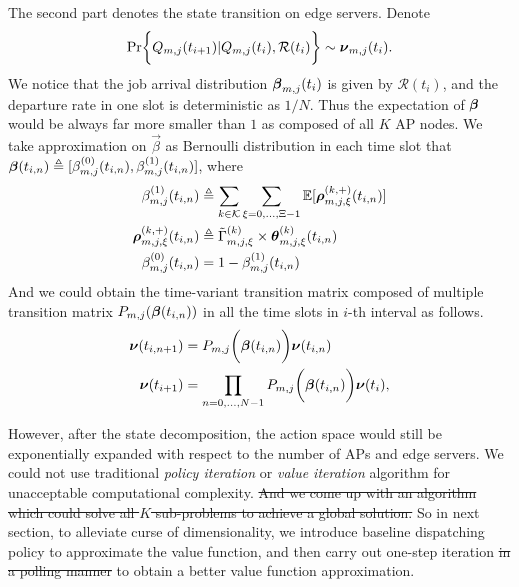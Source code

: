 The second part denotes the state transition on edge servers.
Denote
\begin{align}
    \Pr\Brace{ Q_{m,j}(t_{i+1})|Q_{m,j}(t_{i}), \mathcal{R}(t_{i}) } \sim \vecG{\nu}_{m,j}(t_{i}).
\end{align}
We notice that the job arrival distribution $\boldsymbol{\beta}_{m,j}(t_{i})$ is given by $\mathcal{R}(t_{i})$, and the departure rate in one slot is deterministic as $1/N$.
Thus the expectation of $\boldsymbol{\beta}$ would be always far more smaller than $1$ as composed of all $K$ AP nodes.
We take approximation on $\vec{\beta}$ as Bernoulli distribution in each time slot that $\boldsymbol{\beta}(t_{i,n}) \triangleq [\beta^{(0)}_{m,j}(t_{i,n}), \beta^{(1)}_{m,j}(t_{i,n})]$, where
\begin{align}
    \beta^{(1)}_{m,j}(t_{i,n}) &\triangleq \sum_{k\in\mathcal{K}} \sum_{\xi=0,\dots,\Xi-1} \mathbb{E}[\boldsymbol{\rho}^{(k,+)}_{m,j,\xi}(t_{i,n})]
    \label{eqn_0}
    \\
    \boldsymbol{\rho}^{(k,+)}_{m,j,\xi}(t_{i,n}) &\triangleq \tilde{\Gamma}^{(k)}_{m,j,\xi} \times \boldsymbol{\theta}^{(k)}_{m,j,\xi}(t_{i,n})
    \\
    \beta^{(0)}_{m,j}(t_{i,n}) &= 1-\beta^{(1)}_{m,j}(t_{i,n})
\end{align}
And we could obtain the time-variant transition matrix composed of multiple transition matrix $P_{m,j}(\boldsymbol{\beta}(t_{i,n}))$ in all the time slots in $i$-th interval as follows.
\begin{align}
    \boldsymbol{\nu}(t_{i,n+1}) &= P_{m,j}\bigg(\boldsymbol{\beta}(t_{i,n})\bigg) \boldsymbol{\nu}(t_{i,n})
    \\
    \boldsymbol{\nu}(t_{i+1}) &= \prod_{n=0,\dots,N-1} P_{m,j}\bigg(\boldsymbol{\beta}(t_{i,n})\bigg) \boldsymbol{\nu}(t_{i}),
    \label{eqn_4}
\end{align}

However, after the state decomposition, the action space would still be exponentially expanded with respect to the number of APs and edge servers.
We could not use traditional \emph{policy iteration} or \emph{value iteration} algorithm \cite{sutton1998introduction} for unacceptable computational complexity.
\st{And we come up with an algorithm which could solve all $K$ sub-problems to achieve a global solution.}
So in next section, to alleviate curse of dimensionality, we introduce baseline dispatching policy to approximate the value function, and then carry out one-step iteration \st{in a polling manner} to obtain a better value function approximation.
